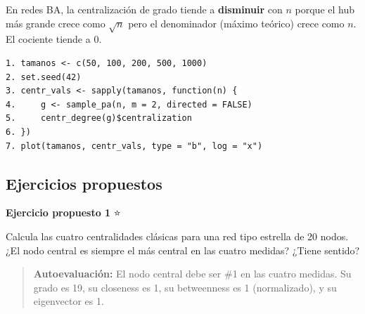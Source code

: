 \documentclass[
  letterpaper,
  DIV=11,
  numbers=noendperiod]{scrreprt}
\begin{document}
\begin{tcolorbox}[enhanced jigsaw, toprule=.15mm, colframe=quarto-callout-note-color-frame, coltitle=black, titlerule=0mm, colback=white, breakable, leftrule=.75mm, arc=.35mm, bottomtitle=1mm, toptitle=1mm, rightrule=.15mm, bottomrule=.15mm, left=2mm, title=\textcolor{quarto-callout-note-color}{\faInfo}\hspace{0.5em}{💡 Pista 2}, colbacktitle=quarto-callout-note-color!10!white, opacityback=0, opacitybacktitle=0.6]

En redes BA, la centralización de grado tiende a \textbf{disminuir} con
\(n\) porque el hub más grande crece como \(\sqrt{n}\) pero el
denominador (máximo teórico) crece como \(n\). El cociente tiende a 0.

\end{tcolorbox}

\begin{tcolorbox}[enhanced jigsaw, toprule=.15mm, colframe=quarto-callout-note-color-frame, coltitle=black, titlerule=0mm, colback=white, breakable, leftrule=.75mm, arc=.35mm, bottomtitle=1mm, toptitle=1mm, rightrule=.15mm, bottomrule=.15mm, left=2mm, title=\textcolor{quarto-callout-note-color}{\faInfo}\hspace{0.5em}{💡 Pista 3 --- Pseudocódigo}, colbacktitle=quarto-callout-note-color!10!white, opacityback=0, opacitybacktitle=0.6]

\begin{verbatim}
1. tamanos <- c(50, 100, 200, 500, 1000)
2. set.seed(42)
3. centr_vals <- sapply(tamanos, function(n) {
4.     g <- sample_pa(n, m = 2, directed = FALSE)
5.     centr_degree(g)$centralization
6. })
7. plot(tamanos, centr_vals, type = "b", log = "x")
\end{verbatim}

\end{tcolorbox}

\subsection*{Ejercicios propuestos}\label{ejercicios-propuestos-5}

\textbf{Ejercicio propuesto 1} ⭐

Calcula las cuatro centralidades clásicas para una red tipo estrella de
20 nodos. ¿El nodo central es siempre el más central en las cuatro
medidas? ¿Tiene sentido?

\begin{quote}
\textbf{Autoevaluación:} El nodo central debe ser \#1 en las cuatro
medidas. Su grado es 19, su closeness es 1, su betweenness es 1
(normalizado), y su eigenvector es 1.
\end{quote}
\end{document}
